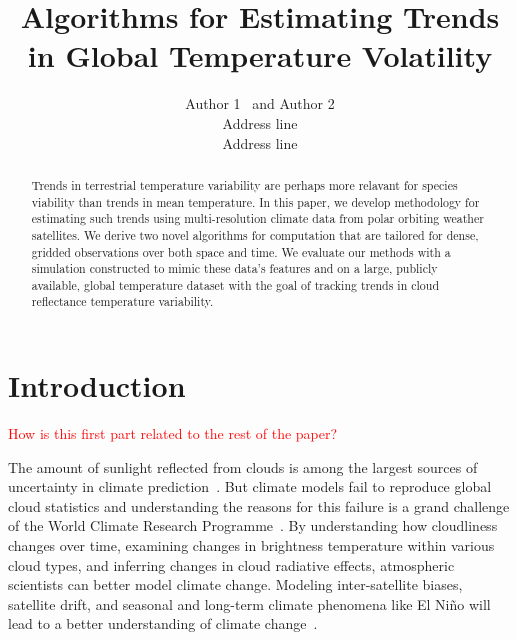 \documentclass[letterpaper]{article} %
\newcommand{\citep}{\cite}
\begin{document}
 

\title{Algorithms for Estimating Trends in Global Temperature Volatility}

\author{Author 1 \ and Author 2\\
Address line\\
Address line
}





\maketitle


\begin{abstract}
Trends in terrestrial temperature variability are perhaps more relavant for species
viability than trends in mean
temperature. In this paper, we develop methodology for estimating such
trends using multi-resolution climate data from polar orbiting weather
satellites. We derive two novel algorithms for computation that are
tailored for dense, gridded observations over both 
space and time. We evaluate our methods with a simulation constructed
to mimic these data's 
features and on a large, publicly available, global
temperature dataset with the goal of tracking trends in
cloud reflectance temperature variability.
\end{abstract}



\section{Introduction}


\textcolor{red}{How is this first part related to the rest of the paper?}

The amount of sunlight reflected from clouds is among the largest
sources of uncertainty in climate
prediction~\citep{BoucherRandall2013}. But climate models fail to
reproduce global cloud statistics and understanding the reasons for
this failure is a grand challenge of the World Climate Research
Programme~\citep{BonyStevens2015}.
By understanding how cloudliness changes over time, examining changes
in brightness temperature within various cloud types, and inferring
changes in cloud radiative effects, atmospheric scientists can better model climate
change. Modeling inter-satellite biases, satellite drift, and
seasonal and long-term climate phenomena like El Ni\~{n}o will lead to
a better understanding of climate
change~\citep{SchreierKahn2014,BaumWielicki1994,BaumWielicki1992,FreyAckerman1996}.
\end{document}
